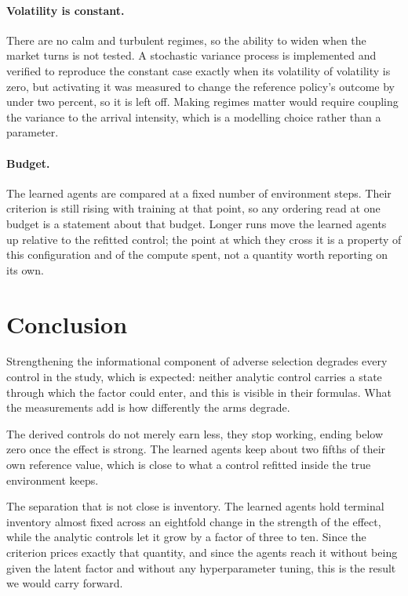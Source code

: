 \documentclass[10pt,twocolumn]{article}
\begin{document}
\paragraph{Volatility is constant.}
There are no calm and turbulent regimes, so the ability to widen when the market turns is not tested. A stochastic
variance process is implemented and verified to reproduce the constant case exactly when its volatility of
volatility is zero, but activating it was measured to change the reference policy's outcome by under two
percent, so it is left off. Making regimes matter would require coupling the variance to the arrival intensity,
which is a modelling choice rather than a parameter.

\paragraph{Budget.}
The learned agents are compared at a fixed number of environment steps. Their criterion is still rising with
training at that point, so any ordering read at one budget is a statement about that budget. Longer runs move the
learned agents up relative to the refitted control; the point at which they cross it is a property of this
configuration and of the compute spent, not a quantity worth reporting on its own.

\section{Conclusion}

Strengthening the informational component of adverse selection degrades every control in the study, which is
expected: neither analytic control carries a state through which the factor could enter, and this is visible in
their formulas. What the measurements add is how differently the arms degrade.

The derived controls do not merely earn less, they stop working, ending below zero once the effect is strong. The
learned agents keep about two fifths of their own reference value, which is close to what a control refitted
inside the true environment keeps.

The separation that is not close is inventory. The learned agents hold terminal inventory almost fixed across an
eightfold change in the strength of the effect, while the analytic controls let it grow by a factor of three to
ten. Since the criterion prices exactly that quantity, and since the agents reach it without being given the
latent factor and without any hyperparameter tuning, this is the result we would carry forward.
\end{document}

